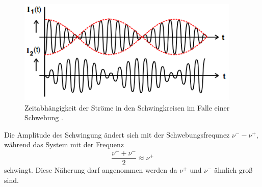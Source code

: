 \begin{figure}[H]
	\centering
	\includegraphics[height=5cm]{picture/Schwebungsfrequenz.PNG}
	\caption{Zeitabhängigkeit der Ströme in den Schwingkreisen im Falle einer Schwebung \cite{sample}.}
	\label{fig:SchFre}
\end{figure}

Die Amplitude des Schwingung ändert sich mit der Schwebungsfrequnez $\nu^- - \nu^+$, während das System mit der Frequenz
\begin{equation*}
	\frac{\nu^+ + \nu^-}{2} \approx \nu^+
\end{equation*}
schwingt. Diese Näherung darf angenommen werden da $\nu^+$ und $\nu^-$ ähnlich groß sind.

